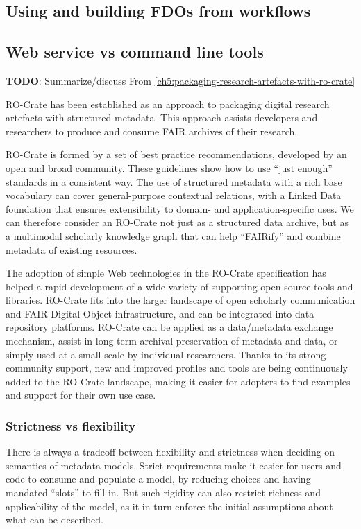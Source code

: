 \subsection{Using and building FDOs from workflows}


\subsection{Web service vs command line tools}


\textbf{TODO}: Summarize/discuss 
From \vref{ch5:packaging-research-artefacts-with-ro-crate}

RO-Crate has been established as an approach to packaging digital
research artefacts with structured metadata. This approach assists
developers and researchers to produce and consume FAIR archives of their
research.

RO-Crate is formed by a set of best practice recommendations, developed
by an open and broad community. These guidelines show how to use ``just
enough'' standards in a consistent way. The use of structured metadata
with a rich base vocabulary can cover general-purpose contextual
relations, with a Linked Data foundation that ensures extensibility to
domain- and application-specific uses. We can therefore consider an
RO-Crate not just as a structured data archive, but as a multimodal
scholarly knowledge graph that can help ``FAIRify'' and combine metadata
of existing resources.

The adoption of simple Web technologies in the RO-Crate specification
has helped a rapid development of a wide variety of supporting open
source tools and libraries. RO-Crate fits into the larger landscape of
open scholarly communication and FAIR Digital Object infrastructure, and
can be integrated into data repository platforms. RO-Crate can be
applied as a data/metadata exchange mechanism, assist in long-term
archival preservation of metadata and data, or simply used at a small
scale by individual researchers. Thanks to its strong community support,
new and improved profiles and tools are being continuously added to the
RO-Crate landscape, making it easier for adopters to find examples and
support for their own use case.

\subsubsection{Strictness vs flexibility}

There is always a tradeoff between flexibility and strictness \cite{ch5-116}
when deciding on semantics of metadata models. Strict requirements make
it easier for users and code to consume and populate a model, by
reducing choices and having mandated ``slots'' to fill in. But such
rigidity can also restrict richness and applicability of the model, as
it in turn enforce the initial assumptions about what can be described.

